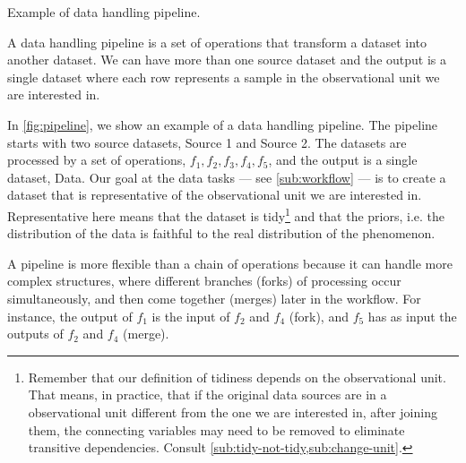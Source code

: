 \begin{figurebox}[label=fig:pipeline]{Example of data handling pipeline.}
  \centering
  \tcblower
  A data handling pipeline is a set of operations that transform a dataset into
  another dataset.  We can have more than one source dataset and the output is a single
  dataset where each row represents a sample in the observational unit we are interested
  in.
\end{figurebox}

In \cref{fig:pipeline}, we show an example of a data handling pipeline.  The pipeline
starts with two source datasets, Source 1 and Source 2.  The datasets are processed by a
set of operations, $f_1, f_2, f_3, f_4, f_5$, and the output is a single dataset,
Data.  Our goal at the data tasks --- see \cref{sub:workflow} --- is to create a dataset
that is representative of the observational unit we are interested in.  Representative
here means that the dataset is tidy\footnote{Remember that our definition of tidiness
depends on the observational unit.  That means, in practice, that if the original data
sources are in a observational unit different from the one we are interested in, after
joining them, the connecting variables may need to be removed to eliminate transitive
dependencies.  Consult \cref{sub:tidy-not-tidy,sub:change-unit}.} and that the priors,
i.e. the distribution of the data is faithful to the real distribution of the phenomenon.

A pipeline is more flexible than a chain of operations because it can handle more complex
structures, where different branches (forks) of processing occur simultaneously, and then
come together (merges) later in the workflow.  For instance, the output of $f_1$ is the
input of $f_2$ and $f_4$ (fork), and $f_5$ has as input the outputs of $f_2$ and $f_4$
(merge).

